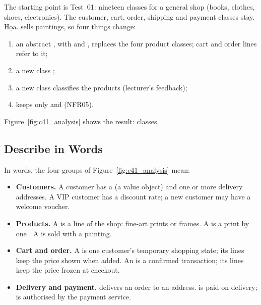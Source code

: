 The starting point is Test~01: nineteen classes for a general shop (books, clothes, shoes, electronics). The
customer, cart, order, shipping and payment classes stay. Họa. sells paintings, so four things change:
\begin{enumerate}
\item an abstract , with  and , replaces the four product classes; cart and
order lines refer to it;
\item a new class ;
\item a new class  classifies the products (lecturer's feedback);
\item {} keeps only  and  (NFR05).
\end{enumerate}
Figure~\ref{fig:c41_analysis} shows the result: \nAnalysisClasses{} classes.


\subsection{Describe in Words}\label{sec:4.1.2}

In words, the four groups of Figure~\ref{fig:c41_analysis} mean:
\begin{itemize}
\item \textbf{Customers.} A customer has a  (a value object) and one or more delivery addresses. A
VIP customer has a discount rate; a new customer may have a welcome voucher.
\item \textbf{Products.} A  is a line of the shop: fine-art prints or frames. A  is a
print by one . A  is sold with a painting.
\item \textbf{Cart and order.} A  is one customer's temporary shopping state; its lines keep the price
shown when added. An  is a confirmed transaction; its lines keep the price frozen at checkout.
\item \textbf{Delivery and payment.}  delivers an order to an address.  is paid on
delivery;  is authorised by the payment service.
\end{itemize}


